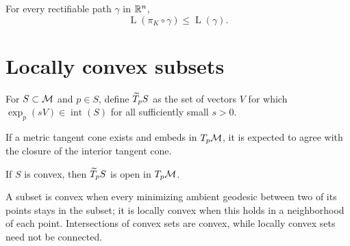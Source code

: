\begin{corollary}
\label{cor:chow-iii-h10-projection-length}
For every rectifiable path $\gamma$ in $\mathbb R^n$,
\[
\operatorname{L}(\pi_K\circ\gamma)\le \operatorname{L}(\gamma).
\]
\end{corollary}

\section{Locally convex subsets}

\begin{definition}
\label{def:chow-iii-h11-interior-tangent-cone}
For $S\subset\M$ and $p\in S$, define $\widetilde T_pS$ as the set of vectors $V$ for which
$\exp_p(sV)\in\operatorname{int}(S)$ for all sufficiently small $s>0$.
\end{definition}

\begin{remark}
\label{rem:chow-iii-h12-tangent-cone-realization}
If a metric tangent cone exists and embeds in $T_p\M$, it is expected to agree with
the closure of the interior tangent cone.
\end{remark}

\begin{lemma}
\label{lem:chow-iii-h13-tangent-cone-open}
If $S$ is convex, then $\widetilde T_pS$ is open in $T_p\M$.
\end{lemma}

\begin{remark}
\label{rem:chow-iii-h14-convexity-variants}
A subset is convex when every minimizing ambient geodesic between two of its points
stays in the subset; it is locally convex when this holds in a neighborhood of each
point.  Intersections of convex sets are convex, while locally convex sets need not
be connected.
\end{remark}

